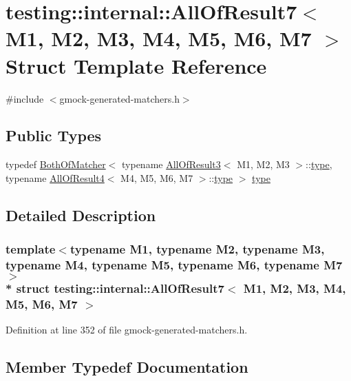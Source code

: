 \hypertarget{structtesting_1_1internal_1_1_all_of_result7}{}\section{testing\+:\+:internal\+:\+:All\+Of\+Result7$<$ M1, M2, M3, M4, M5, M6, M7 $>$ Struct Template Reference}
\label{structtesting_1_1internal_1_1_all_of_result7}


{\ttfamily \#include $<$gmock-\/generated-\/matchers.\+h$>$}

\subsection*{Public Types}
\begin{DoxyCompactItemize}
\item 
typedef \hyperlink{classtesting_1_1internal_1_1_both_of_matcher}{Both\+Of\+Matcher}$<$ typename \hyperlink{structtesting_1_1internal_1_1_all_of_result3}{All\+Of\+Result3}$<$ M1, M2, M3 $>$\+::\hyperlink{structtesting_1_1internal_1_1_all_of_result7_a47ab0d670258434b0e65530591948e8c}{type}, typename \hyperlink{structtesting_1_1internal_1_1_all_of_result4}{All\+Of\+Result4}$<$ M4, M5, M6, M7 $>$\+::\hyperlink{structtesting_1_1internal_1_1_all_of_result7_a47ab0d670258434b0e65530591948e8c}{type} $>$ \hyperlink{structtesting_1_1internal_1_1_all_of_result7_a47ab0d670258434b0e65530591948e8c}{type}
\end{DoxyCompactItemize}


\subsection{Detailed Description}
\subsubsection*{template$<$typename M1, typename M2, typename M3, typename M4, typename M5, typename M6, typename M7$>$\\*
struct testing\+::internal\+::\+All\+Of\+Result7$<$ M1, M2, M3, M4, M5, M6, M7 $>$}



Definition at line 352 of file gmock-\/generated-\/matchers.\+h.



\subsection{Member Typedef Documentation}
